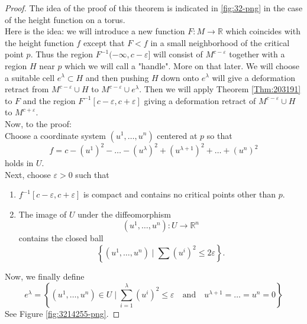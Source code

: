 \documentclass[reqno]{amsart}
\theoremstyle{definition}
\theoremstyle{remark}
\begin{document}
    \begin{proof}
        The idea of the proof of this theorem
        is indicated in \ref{fig:32-png} in
        the case of the height function on a torus.\\
        Here is the idea: we will introduce
        a new function $F \colon M \to \mathbb{R}$ 
        which coincides with the height function $f$ except
        that $F < f$ in a small neighborhood of the critical
        point $p$. Thus the region
        $F^{-1}(-\infty, c-\varepsilon]$ will consist
        of $M^{c-\varepsilon}$ together with a region
        $H$ near $p$ which we will call a "handle". More
        on that later.
        We will choose a suitable cell
        $e^{\lambda} \subset H$ and then
        pushing $H$ down onto $e^{\lambda}$ will give
        a deformation retract
        from $M^{c-\varepsilon} \cup  H$ to 
        $M^{c- \varepsilon} \cup  e^{\lambda}$.
        Then we will apply Theorem \ref{Thm:203191}
        to $F$ and the region
        $F^{-1}\left[ c-\varepsilon, c +\varepsilon \right] $
        giving a deformation retract of
        $M^{c-\varepsilon} \cup  H$ to $M^{c+\varepsilon}$.\\
        \linebreak
        Now, to the proof:\\
        Choose a coordinate system 
        $\left( u^{1},\ldots, u^{n} \right) $ 
        centered at $p$ so that
        \[
        f = c- \left( u^{1} \right)^2 - \ldots
        - \left( u^{\lambda} \right)^2 +
        \left( u^{\lambda+1} \right)^2 +\ldots +
        \left( u^{n} \right)^2
        \] 
        holds in $U$. \\
        Next, choose $\varepsilon > 0$ such that
        \begin{enumerate}
            \item $f^{-1}\left[ c-\varepsilon,
                c + \varepsilon\right] $ is compact
                and contains no critical points other
                than $p$.
            \item The image of $U$ under the diffeomorphism
                \[
                    \left( u^{1},\ldots,
                    u^{n}\right) \colon U \to 
                    \mathbb{R}^{n}
                \] 
                contains the closed ball
                \[
                \left\{ \left( u^{1},\ldots,
                u^{n}\right)  \mid 
            \sum \left( u^{i} \right)^2 \le 2\varepsilon 
        \right\} .
                \] 
        \end{enumerate}
        Now, we finally define 
        \[
        e^{\lambda} =
        \left\{ \left( u^{1},\ldots,
        u^{n}\right) \in U \mid 
    \sum_{i=1}^{\lambda} \left( u^{i} \right)^2 \le \varepsilon
    \quad \text{and} \quad
u^{\lambda+1} = \ldots = u^{n} = 0\right\} 
        \] 
        See Figure \ref{fig:3214255-png}.


\end{proof}
\end{document}

